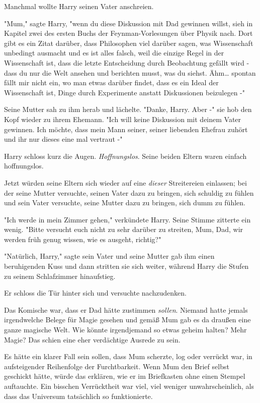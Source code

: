 {Manchmal wollte Harry seinen Vater anschreien.

"Mum," sagte Harry, "wenn du diese Diskussion mit Dad gewinnen willst, sieh in Kapitel zwei des ersten Buchs der Feynman-Vorlesungen über Physik nach. Dort gibt es ein Zitat darüber, dass Philosophen viel darüber sagen, was Wissenschaft unbedingt ausmacht und es ist alles falsch, weil die einzige Regel in der Wissenschaft ist, dass die letzte Entscheidung durch Beobachtung gefällt wird - dass du nur die Welt ansehen und berichten musst, was du siehst. Ähm… spontan fällt mir nicht ein, wo man etwas darüber findet, dass es ein Ideal der Wissenschaft ist, Dinge durch Experimente anstatt Diskussionen beizulegen -"

Seine Mutter sah zu ihm herab und lächelte. "Danke, Harry. Aber -" sie hob den Kopf wieder zu ihrem Ehemann. "Ich will keine Diskussion mit deinem Vater gewinnen. Ich möchte, dass mein Mann seiner, seiner liebenden Ehefrau zuhört und ihr nur dieses eine mal vertraut -"

Harry schloss kurz die Augen. \emph{Hoffnungslos}. Seine beiden Eltern waren einfach hoffnungslos.

Jetzt würden seine Eltern sich wieder auf eine \emph{dieser} Streitereien einlassen; bei der seine Mutter versuchte, seinen Vater dazu zu bringen, sich schuldig zu fühlen und sein Vater versuchte, seine Mutter dazu zu bringen, sich dumm zu fühlen.

"Ich werde in mein Zimmer gehen," verkündete Harry. Seine Stimme zitterte ein wenig. "Bitte versucht euch nicht zu sehr darüber zu streiten, Mum, Dad, wir werden früh genug wissen, wie es ausgeht, richtig?"

"Natürlich, Harry," sagte sein Vater und seine Mutter gab ihm einen beruhigenden Kuss und dann stritten sie sich weiter, während Harry die Stufen zu seinem Schlafzimmer hinaufstieg.

Er schloss die Tür hinter sich und versuchte nachzudenken.

Das Komische war, dass er Dad hätte zustimmen \emph{sollen}. Niemand hatte jemals irgendwelche Belege für Magie gesehen und gemäß Mum gab es da draußen eine ganze magische Welt. Wie könnte irgendjemand so etwas geheim halten? Mehr Magie? Das schien eine eher verdächtige Ausrede zu sein.

Es hätte ein klarer Fall sein sollen, dass Mum scherzte, log oder verrückt war, in aufsteigender Reihenfolge der Furchtbarkeit. Wenn Mum den Brief selbst geschickt hätte, würde das erklären, wie er im Briefkasten ohne einen Stempel auftauchte. Ein bisschen Verrücktheit war viel, viel weniger unwahrscheinlich, als dass das Universum tatsächlich so funktionierte.

}
